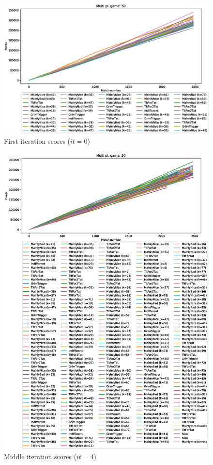 \documentclass[journal,10pt,twoside]{IEEEtran}
\begin{document}
\begin{figure}[!ht]
    \centering
    \includegraphics[width=1\columnwidth]{../img/cipdmp-incr/alt1/cipdmp-scores-increasing-pop-50-r0}
    \caption{First iteration scores ($it=0$)}
    \label{fig:incrCFI}
\end{figure}

\begin{figure}[!ht]
    \centering
    \includegraphics[width=1\columnwidth]{../img/cipdmp-incr/alt1/cipdmp-scores-increasing-pop-50-r4}
    \caption{Middle iteration scores ($it=4$)}
    \label{fig:incrCMI}
\end{figure}
\end{document}
